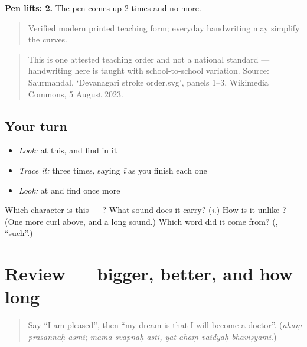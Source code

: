 \textbf{Pen lifts: 2.} The pen comes up 2 times and no more.

\begin{quote}
Verified modern printed teaching form; everyday handwriting may simplify the curves.
\end{quote}

\begin{quote}
This is one attested teaching order and not a national standard — handwriting here is taught with school-to-school variation. Source: Saurmandal, ‘Devanagari  stroke order.svg’, panels 1–3, Wikimedia Commons, 5 August 2023.
\end{quote}

\subsection*{Your turn}
\begin{itemize}
\raggedright
  \item \emph{Look:} at this, and find  in it
\end{itemize}

\begin{quote}
\end{quote}

\begin{itemize}
\raggedright
  \item \emph{Trace it:}  three times, saying \emph{ī} as you finish each one
  \item \emph{Look:} at \textbf{ } and find  once more
\end{itemize}

\begin{tcolorbox}[breakable,colback=teal!4,colframe=teal!35!black,title={Before you move on}]
Which character is this — ? What sound does it carry? (\emph{ī}.) How is it unlike \textbf{}? (One more curl above, and a long sound.) Which word did it come from? (\textbf{}, \textquotedblleft{}such\textquotedblright{}.)
\end{tcolorbox}
\section[(review)]{Review — bigger, better, and how long}

\label{lesson:SA-R283-comparing-and-time}



\begin{quote}
Say \textquotedblleft{}I am pleased\textquotedblright{}, then \textquotedblleft{}my dream is that I will become a doctor\textquotedblright{}. (\emph{ahaṃ prasannaḥ asmi}; \emph{mama svapnaḥ asti, yat ahaṃ vaidyaḥ bhaviṣyāmi}.)
\end{quote}

